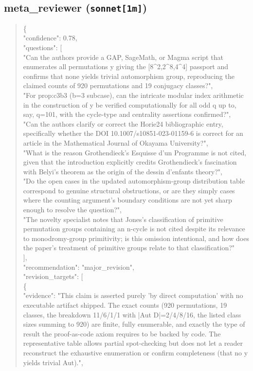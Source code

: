 \documentclass[11pt]{article}
\begin{document}
\subsection*{meta\_reviewer (\texttt{sonnet[1m]})}
\begin{quote}\small\ttfamily\raggedright
\{\\
  "confidence": 0.78,\\
  "questions": [\\
    "Can the authors provide a GAP, SageMath, or Magma script that enumerates all permutations y giving the [8\^{}2,2\^{}8,4\^{}4] passport and confirms that none yields trivial automorphism group, reproducing the claimed counts of 920 permutations and 19 conjugacy classes?",\\
    "For prop:c3b3 (b=3 subcase), can the intricate modular index arithmetic in the construction of y be verified computationally for all odd q up to, say, q=101, with the cycle-type and centrality assertions confirmed?",\\
    "Can the authors clarify or correct the Horie24 bibliographic entry, specifically whether the DOI 10.1007/s10851-023-01159-6 is correct for an article in the Mathematical Journal of Okayama University?",\\
    "What is the reason Grothendieck's Esquisse d'un Programme is not cited, given that the introduction explicitly credits Grothendieck's fascination with Belyi's theorem as the origin of the dessin d'enfants theory?",\\
    "Do the open cases in the updated automorphism-group distribution table correspond to genuine structural obstructions, or are they simply cases where the counting argument's boundary conditions are not yet sharp enough to resolve the question?",\\
    "The novelty specialist notes that Jones's classification of primitive permutation groups containing an n-cycle is not cited despite its relevance to monodromy-group primitivity; is this omission intentional, and how does the paper's treatment of primitive groups relate to that classification?"\\
  ],\\
  "recommendation": "major\_revision",\\
  "revision\_targets": [\\
    \{\\
      "evidence": "This claim is asserted purely 'by direct computation' with no executable artifact shipped. The exact counts (920 permutations, 19 classes, the breakdown 11/6/1/1 with |Aut D|=2/4/8/16, the listed class sizes summing to 920) are finite, fully enumerable, and exactly the type of result the proof-as-code axiom requires to be backed by code. The representative table allows partial spot-checking but does not let a reader reconstruct the exhaustive enumeration or confirm completeness (that no y yields trivial Aut).",\\

\end{quote}
\end{document}
